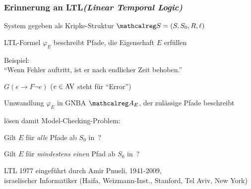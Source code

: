\begin{frame}
  \frametitle{Erinnerung an LTL\hfill {\normalsize\emph{(Linear Temporal Logic)}}}

  \begin{Itemize}
    \item%
      System gegeben als Kripke-Struktur $\calS = (S,S_0,R,\ell)$
      \par\smallskip
    \item%
      LTL-Formel $\varphi_E$ beschreibt Pfade,
      die Eigenschaft $E$ erfüllen
      \par\smallskip
    \item%
      Beispiel:\\
      "`Wenn Fehler auftritt, ist er nach endlicher Zeit behoben."'
      \par\smallskip
      $G(e \to F \neg e)$ \hfill {\footnotesize ($e \in \textup{AV}$ steht für "`Error"')}
      \par\smallskip
    \item%
      Umwandlung $\varphi_E$ in GNBA $\Aut{A}_E$,
      der zulässige Pfade beschreibt
      \par\smallskip
    \item%
      lösen damit Model-Checking-Problem:
      \begin{Itemize}
        \item
          Gilt $E$ für \emph{alle} Pfade ab $S_0$ in \calS\,?\\
        \item
          Gilt $E$ für \emph{mindestens einen} Pfad ab $S_0$ in \calS\,?\\
      \end{Itemize}
  \end{Itemize}

  \par\bigskip
    \begin{footnotesize}
      LTL 1977 eingeführt durch Amir Pnueli, 1941-2009, \\
      israelischer Informatiker (Haifa, Weizmann-Inst., Stanford, Tel Aviv, New York)
      \par
    \end{footnotesize}

\end{frame}

